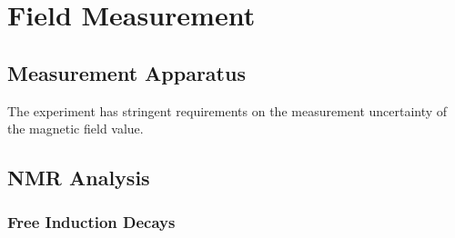 \chapter{Field Measurement}

\section{Measurement Apparatus}

The \gmtwo experiment has stringent requirements on the measurement uncertainty of the magnetic field value.  


\section{NMR Analysis}
\subsection{Free Induction Decays}

